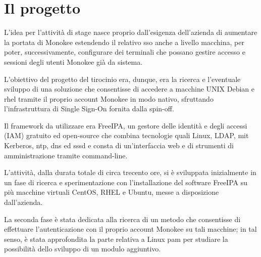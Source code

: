 \section{Il progetto}

L'idea per l'attività di stage nasce proprio dall'esigenza dell'azienda di aumentare la portata di Monokee estendendo il 
relativo \acrshort{sso} anche a livello macchina, per poter, successivamente, configurare dei terminali
che possano gestire accesso e sessioni degli utenti Monokee già da sistema.

L'obiettivo del progetto del tirocinio era, dunque, era la ricerca e l'eventuale sviluppo di una soluzione che consentisse
di accedere a macchine UNIX Debian e \acrfull{rhel} tramite il proprio account Monokee in modo nativo, sfruttando l'infrastruttura
di Single Sign-On fornita dalla spin-off.

Il framework da utilizzare era FreeIPA, un gestore delle identità e degli accessi (\acrshort{IAM})
gratuito ed open-source che combina tecnologie quali Linux, \acrfull{LDAP}, \acrfull{mit} Kerberos, \acrfull{ntp}, \acrfull{dns} ed \acrfull{sssd} e consta di un'interfaccia web
e di strumenti di amministrazione tramite command-line. 

L'attività, dalla durata totale di circa trecento ore, si è sviluppata inizialmente in un fase di ricerca e sperimentazione
con l'installazione del software FreeIPA su più macchine virtuali CentOS, RHEL e Ubuntu,
messe a disposizione dall'azienda.

La seconda fase è stata dedicata alla ricerca di un metodo che consentisse di effettuare l'autenticazione con il
proprio account Monokee su tali macchine; in tal senso, è stata approfondita la parte relativa a 
Linux \acrshort{pam} per studiare la possibilità dello sviluppo di un modulo aggiuntivo. 

